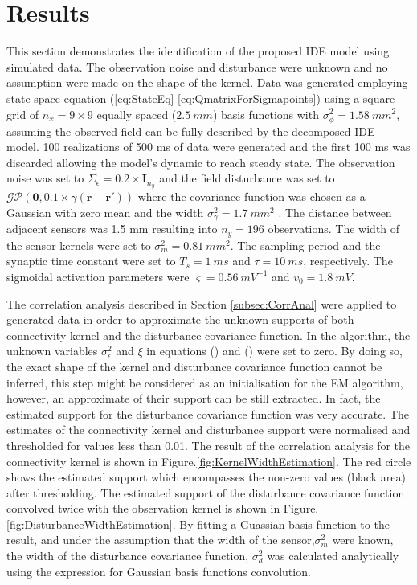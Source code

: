\documentclass[]{article}
\begin{document}
\section{Results}
This section demonstrates the identification of the proposed IDE model using simulated data. The observation noise and disturbance were unknown and no assumption were made on the shape of the kernel.  Data was generated employing state space equation (\ref{eq:StateEq}-\ref{eq:QmatrixForSigmapoints}) using a square grid of $n_x= 9 \times 9$ equally spaced ($2.5~mm$) basis functions with $\sigma_{\phi}^2=1.58~mm^2$, assuming the observed field can be fully described by the decomposed IDE model. 100 realizations of 500 ms of data were generated and the first 100 ms was discarded allowing the model's dynamic to reach steady state. The observation noise was set to $\Sigma_{\epsilon}=0.2\times \mathbf I_{n_y}$ and the field disturbance was set to $\mathcal{GP}(\mathbf 0,0.1 \times\gamma(\mathbf{r}-\mathbf{r}'))$ where the covariance function was chosen as a Gaussian with zero mean and the width $\sigma_{\gamma}^2=1.7~mm^2$ . The distance between adjacent sensors was 1.5 mm resulting into $n_y = 196$ observations. The width of the sensor kernels were set to $\sigma_m^2=0.81~mm^2$. The sampling period and the synaptic time constant were set to $T_s = 1~ms$  and $\tau = 10~ms$, respectively. The sigmoidal activation parameters were $\varsigma=0.56~mV^{-1}$ and $v_0=1.8~mV$.

The correlation analysis described in Section \ref{subsec:CorrAnal} were applied to generated data in order to approximate the unknown supports of both connectivity kernel and the disturbance covariance function. In the algorithm, the unknown variables $\sigma_{\epsilon}^2$ and $\xi$ in equations () and () were set to zero. By doing so, the exact shape of the kernel and disturbance covariance function cannot be inferred, this step might be considered as an initialisation for the EM algorithm, however, an approximate of their support can be still extracted. In fact, the estimated support for the disturbance covariance function was very accurate. The estimates of the connectivity kernel and disturbance support were normalised and thresholded for values less than 0.01. The result of the correlation analysis for the connectivity kernel is shown in Figure.\ref{fig:KernelWidthEstimation}. The red circle shows the estimated support which encompasses the non-zero values (black area) after thresholding. The estimated support of the disturbance covariance function convolved twice with the observation kernel is shown in Figure.\ref{fig:DisturbanceWidthEstimation}. By fitting a Guassian basis function to the result, and under the assumption that the width of the sensor,$\sigma_m^2$ were known, the width of the disturbance covariance function, $\sigma_d^2$ was calculated analytically using the expression for Gaussian basis functions convolution.
\end{document}
